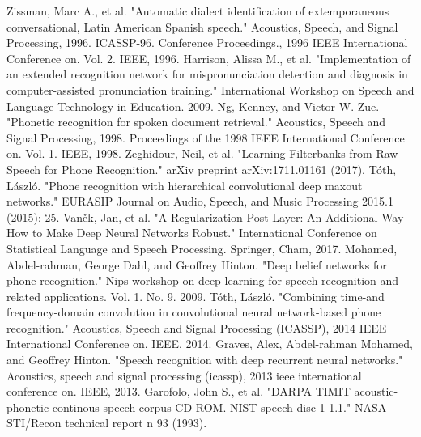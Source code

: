 \documentclass[conference]{IEEEtran}
\begin{document}
%
%
%
\begin{thebibliography}{1}

Zissman, Marc A., et al. "Automatic dialect identification of extemporaneous conversational, Latin American Spanish speech." Acoustics, Speech, and Signal Processing, 1996. ICASSP-96. Conference Proceedings., 1996 IEEE International Conference on. Vol. 2. IEEE, 1996.
Harrison, Alissa M., et al. "Implementation of an extended recognition network for mispronunciation detection and diagnosis in computer-assisted pronunciation training." International Workshop on Speech and Language Technology in Education. 2009.
Ng, Kenney, and Victor W. Zue. "Phonetic recognition for spoken document retrieval." Acoustics, Speech and Signal Processing, 1998. Proceedings of the 1998 IEEE International Conference on. Vol. 1. IEEE, 1998.
Zeghidour, Neil, et al. "Learning Filterbanks from Raw Speech for Phone Recognition." arXiv preprint arXiv:1711.01161 (2017).
Tóth, László. "Phone recognition with hierarchical convolutional deep maxout networks." EURASIP Journal on Audio, Speech, and Music Processing 2015.1 (2015): 25.
Vaněk, Jan, et al. "A Regularization Post Layer: An Additional Way How to Make Deep Neural Networks Robust." International Conference on Statistical Language and Speech Processing. Springer, Cham, 2017.
Mohamed, Abdel-rahman, George Dahl, and Geoffrey Hinton. "Deep belief networks for phone recognition." Nips workshop on deep learning for speech recognition and related applications. Vol. 1. No. 9. 2009.
Tóth, László. "Combining time-and frequency-domain convolution in convolutional neural network-based phone recognition." Acoustics, Speech and Signal Processing (ICASSP), 2014 IEEE International Conference on. IEEE, 2014.
Graves, Alex, Abdel-rahman Mohamed, and Geoffrey Hinton. "Speech recognition with deep recurrent neural networks." Acoustics, speech and signal processing (icassp), 2013 ieee international conference on. IEEE, 2013.
Garofolo, John S., et al. "DARPA TIMIT acoustic-phonetic continous speech corpus CD-ROM. NIST speech disc 1-1.1." NASA STI/Recon technical report n 93 (1993).
\end{thebibliography}
\end{document}
